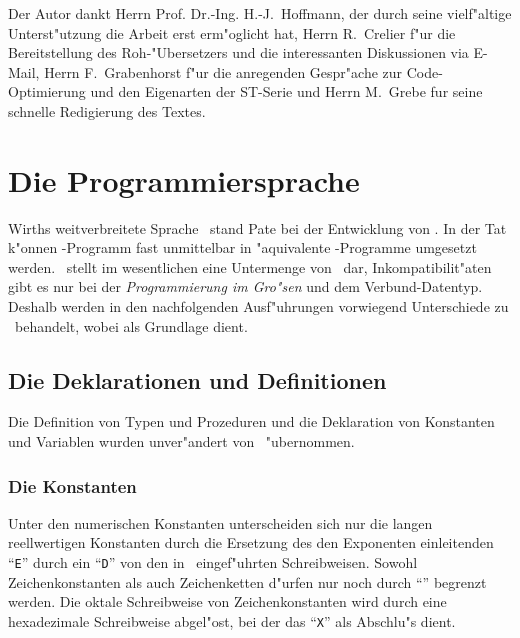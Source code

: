 Der Autor dankt Herrn Prof. Dr.-Ing. H.-J.~Hoffmann, der durch seine vielf"altige
Unterst"utzung die Arbeit erst erm"oglicht hat, Herrn R.~Crelier f"ur die
Bereitstellung des Roh-"Ubersetzers und die interessanten Diskussionen via
E-Mail, Herrn F.~Grabenhorst f"ur die anregenden Gespr"ache zur
Code-Optimierung und den Eigenarten der ST-Serie und Herrn M.~Grebe fur
seine schnelle Redigierung des Textes.


\section{Die Programmiersprache \oberon}
\label{Die Sprache Oberon}

Wirths weitverbreitete Sprache \modula\ stand Pate bei der Entwicklung
von \oberon.
In der Tat k"onnen \oberon-Programm fast unmittelbar in "aquivalente
\modula-Programme umgesetzt werden.
\oberon\ stellt im wesentlichen eine Untermenge von \modula\ dar,
Inkompatibilit"aten gibt es nur bei der {\it Programmierung im Gro"sen\/}
und dem Verbund-Datentyp.
Deshalb werden in den nachfolgenden Ausf"uhrungen vorwiegend Unterschiede
zu \modula\ behandelt, wobei als Grundlage \cite{oberon2} dient.


\subsection{Die Deklarationen und Definitionen}

Die Definition von Typen und Prozeduren und die Deklaration von Konstanten und
Variablen wurden unver"andert von \modula\ "ubernommen.

\subsubsection{Die Konstanten}

Unter den numerischen Konstanten unterscheiden sich nur die langen reellwertigen
Konstanten durch die Ersetzung des den Exponenten einleitenden "`{\tt E}"' durch
ein "`{\tt D}"' von den in \modula\ eingef"uhrten Schreibweisen.
Sowohl Zeichenkonstanten als auch Zeichenketten d"urfen nur noch durch
"`{\tt{}}"' begrenzt werden.
Die oktale Schreibweise von Zeichenkonstanten wird durch eine hexadezimale
Schreibweise abgel"ost, bei der das "`{\tt X}"' als Abschlu"s dient.

